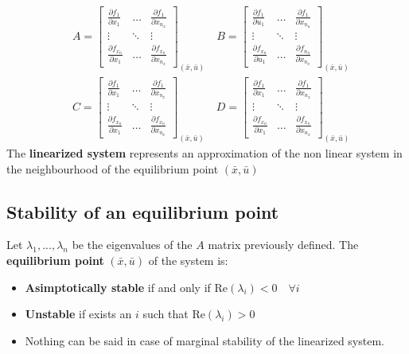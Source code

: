 {
    \large{
        \begin{align*}
            &A = \begin{bmatrix}
                \frac{\partial f_1}{\partial x_1} & \ldots & \frac{\partial f_1}{\partial x_{n_x}} \\
                \vdots                            & \ddots &  \vdots \\
                \frac{\partial f_{x_n}}{\partial x_1} & \ldots & \frac{\partial f_{x_n}}{\partial x_{n_x}}
            \end{bmatrix}_{(\bar{x}, \bar{u})} \quad
            B = \begin{bmatrix}
                \frac{\partial f_1}{\partial u_1} & \ldots & \frac{\partial f_1}{\partial x_{n_u}} \\
                \vdots                            & \ddots &  \vdots \\
                \frac{\partial f_{x_n}}{\partial u_1} & \ldots & \frac{\partial f_{n_u}}{\partial x_{n_x}}
            \end{bmatrix}_{(\bar{x}, \bar{u})}\\
            &C = \begin{bmatrix}
                \frac{\partial f_1}{\partial x_1} & \ldots & \frac{\partial f_1}{\partial x_{n_x}} \\
                \vdots                            & \ddots &  \vdots \\
                \frac{\partial f_{x_n}}{\partial x_1} & \ldots & \frac{\partial f_{x_n}}{\partial x_{n_x}}
            \end{bmatrix}_{(\bar{x}, \bar{u})}  \quad
            D = \begin{bmatrix}
                \frac{\partial f_1}{\partial x_1} & \ldots & \frac{\partial f_1}{\partial x_{n_x}} \\
                \vdots                            & \ddots &  \vdots \\
                \frac{\partial f_{x_n}}{\partial x_1} & \ldots & \frac{\partial f_{x_n}}{\partial x_{n_x}}
            \end{bmatrix}_{(\bar{x}, \bar{u})}
        \end{align*}
    }
}
The \textbf{linearized system} represents an approximation of the non linear system in the neighbourhood of the equilibrium point $(\bar{x}, \bar{u})$
\subsection{Stability of an equilibrium point}
Let $\lambda_1, ..., \lambda_{n}$ be the eigenvalues of the $A$ matrix  previously defined. The \textbf{equilibrium point} $(\bar{x}, \bar{u})$ of the system is:
\begin{itemize}
    \item \textbf{Asimptotically stable} if and only if $\textrm{Re}(\lambda_i)<0 \quad \forall i$
    \item \textbf{Unstable} if exists an $i$ such that $\textrm{Re}(\lambda_i)>0$
    \item Nothing can be said in case of marginal stability of the linearized system. 
\end{itemize}


